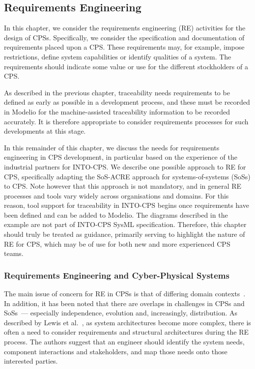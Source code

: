 \subsection{Requirements Engineering}
\label{sec:method:reqeng}

In this chapter, we consider the requirements engineering (RE) activities for the design of CPSs. Specifically, we consider the specification and documentation of requirements placed upon a CPS. These requirements may, for example, impose restrictions, define system capabilities or identify qualities of a system. The requirements should indicate some value or use for the different stockholders of a CPS.

As described in the previous chapter, traceability needs requirements to be defined as early as possible in a development process, and these must be recorded in Modelio for the machine-assisted traceability information to be recorded accurately. It is therefore appropriate to consider requirements processes for such developments at this stage.

In this remainder of this chapter, we discuss the needs for requirements engineering in CPS development, in particular based on the experience of the industrial partners for INTO-CPS. We describe one possible approach to RE for CPS, specifically adapting the SoS-ACRE approach for systems-of-systems (SoSs) to CPS. Note however that this approach is not mandatory, and in general RE processes and tools vary widely across organisations and domains. For this reason, tool support for traceability in INTO-CPS begins once requirements have been defined and can be added to Modelio. The diagrams described in the example are not part of INTO-CPS SysML specification. Therefore, this chapter should truly be treated as guidance, primarily serving to highlight the nature of RE for CPS, which may be of use for both new and more experienced CPS teams.


\subsubsection{Requirements Engineering and Cyber-Physical Systems}

The main issue of concern for RE in CPSs is that of differing domain contexts~\cite{Wiesner&14}. In addition, it has been noted that there are overlaps in challenges in CPSs and SoSs~\cite{Penzenstadler&12}--- especially independence, evolution and, increasingly, distribution. As described by Lewis et al.~\cite{Lewis&09}, as system architectures become more complex, there is often a need to consider requirements and structural architectures during the RE process. The authors suggest that an engineer should identify the system needs, component interactions and stakeholders, and map those needs onto those interested parties. %

